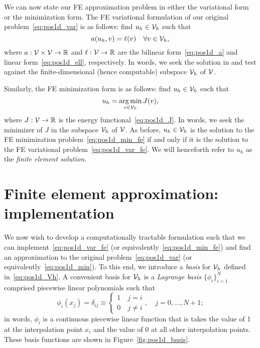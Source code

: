 We can now state our FE approximation problem in either the variational form or the minimization form. The FE variational formulation of our original problem~\eqref{eq:pos1d_var} is as follows: find $u_h \in \mathcal{V}_h$ such that
\begin{equation}
  a(u_h,v) = \ell(v) \quad \forall v \in \mathcal{V}_h,
  \label{eq:pos1d_var_fe}
\end{equation}
where $a: \mathcal{V} \times \mathcal{V} \to \mathbb{R}$ and $\ell: \mathcal{V} \to \mathbb{R}$ are the bilinear form~\eqref{eq:pos1d_a} and linear form~\eqref{eq:pos1d_ell}, respectively. In words, we seek the solution in and test against the finite-dimensional (hence computable) subspace $\mathcal{V}_h$ of $\mathcal{V}$.

Similarly, the FE minimization form is as follows: find $u_h \in \mathcal{V}_h$ such that
\begin{equation}
  u_h = \operatorname*{arg\,min}_{v \in \mathcal{V}_h} J(v),
  \label{eq:pos1d_min_fe}
\end{equation}
where $J: \mathcal{V} \to \mathbb{R}$ is the energy functional~\eqref{eq:pos1d_J}. In words, we seek the minimizer of $J$ in the subspace $\mathcal{V}_h$ of $\mathcal{V}$.  %
As before, $u_h \in \mathcal{V}_h$ is the solution to the FE minimization problem~\eqref{eq:pos1d_min_fe} if and only if it is the solution to the FE variational problem~\eqref{eq:pos1d_var_fe}. We will henceforth refer to $u_h$ as the \emph{finite element solution}.


\section{Finite element approximation: implementation}
We now wish to develop a computationally tractable formulation such that we can implement~\eqref{eq:pos1d_var_fe} (or equivalently~\eqref{eq:pos1d_min_fe}) and find an approximation to the original problem~\eqref{eq:pos1d_var} (or equivalently~\eqref{eq:pos1d_min}).  To this end, we introduce a \emph{basis} for $\mathcal{V}_h$ defined in~\eqref{eq:pos1d_Vh}.  A convenient basis for $\mathcal{V}_h$ is a \emph{Lagrange basis}  $\{\phi_i\}_{i=1}^N$ comprised piecewise linear polynomials such that 
\begin{equation*}
  \phi_i(x_j) = \delta_{ij} \equiv  \begin{cases}
    1 \quad j = i \\
    0 \quad j\neq i
  \end{cases},
  \quad j = 0,\dots,N+1;
\end{equation*}
in words, $\phi_i$ is a continuous piecewise linear function that is takes the value of 1 at the interpolation point $x_i$ and the value of 0 at all other interpolation points.  These basis functions are shown in Figure~\ref{fig:pos1d_basis}.

